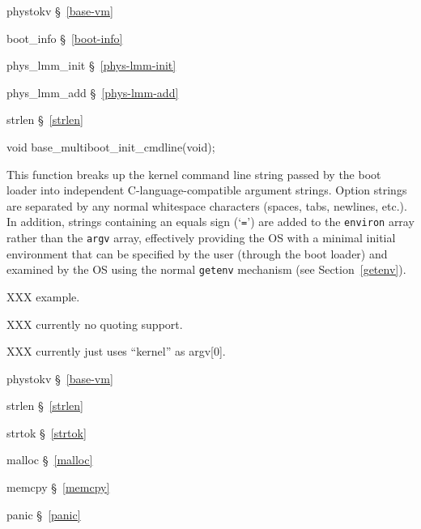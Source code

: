 \begin{apidep}
	\item[phystokv]		\S~\ref{base-vm}
	\item[boot_info]	\S~\ref{boot-info}
	\item[phys_lmm_init]	\S~\ref{phys-lmm-init}
	\item[phys_lmm_add]	\S~\ref{phys-lmm-add}
	\item[strlen]		\S~\ref{strlen}
\end{apidep}

\label{base-multiboot-init-cmdline}
\begin{apisyn}

	\funcproto void base_multiboot_init_cmdline(void);
\end{apisyn}
\begin{apidesc}
	This function breaks up the kernel command line string
	passed by the boot loader
	into independent C-language-compatible argument strings.
	Option strings are separated by any normal whitespace characters
	(spaces, tabs, newlines, etc.).
	In addition, strings containing an equals sign (`{\tt =}')
	are added to the {\tt environ} array rather than the {\tt argv} array,
	effectively providing the OS with a minimal initial environment
	that can be specified by the user (through the boot loader)
	and examined by the OS using the normal {\tt getenv} mechanism
	(see Section~\ref{getenv}).

	XXX example.

	XXX currently no quoting support.

	XXX currently just uses ``kernel'' as argv[0].
\end{apidesc}
\begin{apidep}
	\item[phystokv]		\S~\ref{base-vm}
	\item[strlen]		\S~\ref{strlen}
	\item[strtok]		\S~\ref{strtok}
	\item[malloc]		\S~\ref{malloc}
	\item[memcpy]		\S~\ref{memcpy}
	\item[panic]		\S~\ref{panic}
\end{apidep}


